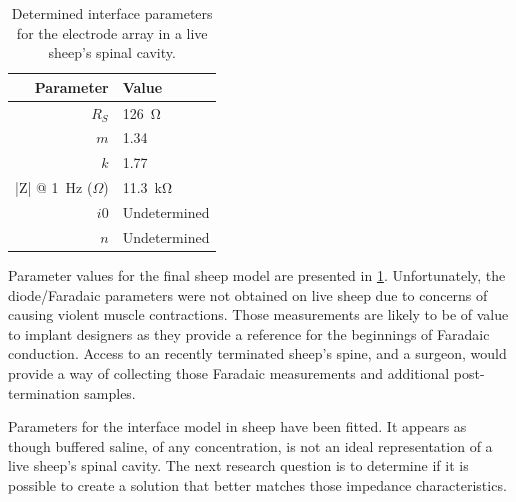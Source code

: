     \begin{table}
      \caption{Determined interface parameters for the electrode array in a live sheep's spinal cavity.}
      \label{tab:ModelParameters_sheep}
      \begin{center}
        \begin{tabular}{r | l}
            Parameter & Value \\
            \hline

            $R_{S}$ & \SI{126}{\ohm} \\

            $m$& 1.34\\
            $k$ & 1.77\\
            |Z| @ \SI{1}{\hertz} ($\Omega$)& \SI{11.3}{\kilo\ohm} \\

            $i0$ & Undetermined\\
            $n$ & Undetermined\\
        \end{tabular}
      \end{center}
    \end{table}
    Parameter values for the final sheep model are presented in \cref{tab:ModelParameters_sheep}.
    Unfortunately, the diode/Faradaic parameters were not obtained on live sheep due to concerns of causing violent muscle contractions.
    Those measurements are likely to be of value to implant designers as they provide a reference for the beginnings of Faradaic conduction.
    Access to an recently terminated sheep's spine, and a surgeon, would provide a way of collecting those Faradaic measurements and additional post-termination samples.

    Parameters for the interface model in sheep have been fitted.
    It appears as though buffered saline, of any concentration, is not an ideal representation of a live sheep's spinal cavity.
    The next research question is to determine if it is possible to create a solution that better matches those impedance characteristics.


